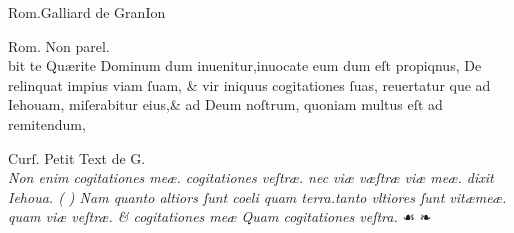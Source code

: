 \documentclass{article}
\begin{document}
\vspace{-3.5\baselineskip}
\setlength{\columnsep}{3mm}
\begin{multicols}{4}
	\tiny
	\centering
	Rom.Galliard de GranIon\\
	\vspace{\baselineskip}
	\fontsize{4}{4.5}\selectfont
	\justifying
	\noindent {}

	\columnbreak

	\centering
	\tiny
	Rom. Non parel.\\
	\vspace{\baselineskip}
	\fontsize{3}{3}\selectfont
	\justifying
	\noindent bit te Qu\ae{}rite Dominum dum inuenitur,inuocate eum dum eſt propiqnus,\linebreak%
	De relinquat impius viam ſuam, \& vir iniquus cogitationes ſuas, reuertatur\linebreak%
	que ad Iehouam, miſerabitur eius,\& ad Deum noſtrum, quoniam multus eſt\linebreak%
	ad remitendum,
	\columnbreak

	\centering
	\tiny
	Curſ. Petit Text de G.\\
	\vspace{\baselineskip}
	\fontsize{4}{4.5}\selectfont
	\justifying
	\noindent \textit{Non enim cogitationes me\ae{}. cogitationes veſtr\ae{}. nec vi\ae{} v\ae{}ſtr\ae{} viæ \linebreak
		me\ae{}. dixit Iehoua. ( {\grecs {}\selectfont{}} ) Nam quanto altiors ſunt coeli quam\linebreak
		terra.tanto vltiores ſunt vit\ae{}me\ae{}. quam vi\ae{} veſtr\ae{}. \& cogitationes\linebreak
		me\ae{} Quam {\normalfont cogitationes} veſtra.} \quad ☙ ❧


\end{multicols}
\end{document}
